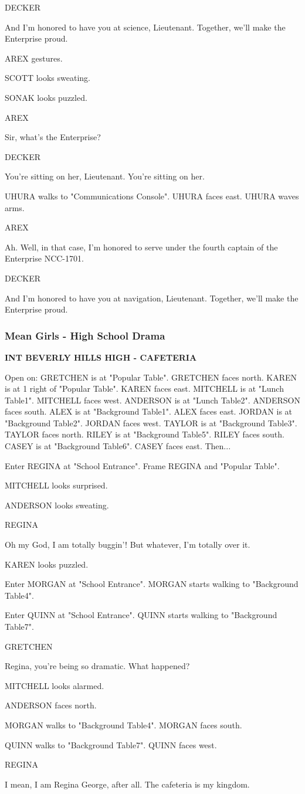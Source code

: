 \documentclass[11pt,letterpaper,oldstylefigures]{memoir}
\newcommand{\slugline}[1]{\nobreak\textbf{\MakeUppercase{#1}}\par\nobreak\vspace{1\baselineskip}}
\newcommand{\speaker}[1]{\nobreak\hspace*{0.333\textwidth}\MakeUppercase{#1}\par\nobreak\vspace{0.5\baselineskip}}
\newcommand{\dialogue}[1]{\nobreak\hspace*{0.25\textwidth}\begin{minipage}{0.5\textwidth}#1\end{minipage}\par\vspace{1\baselineskip}}
\newcommand{\stagedir}[1]{#1\par\vspace{1\baselineskip}}
\newenvironment{FountainExample}
  {\begingroup
  \ttfamily\small
   \setlength{\parindent}{0pt}
  \setlength{\parskip}{0.5em}
  \allowdisplaybreaks
  \setlength{\displaywidowpenalty}{0}
  \setlength{\widowpenalty}{0}
  \setlength{\clubpenalty}{0}
  \setlength{\interlinepenalty}{0}
}
  {\endgroup}
\newcommand{\paragraphbreak}{\vspace{0.5em}}
\begin{document}
\begin{FountainExample}
\speaker{DECKER}
\dialogue{And I'm honored to have you at science, Lieutenant. Together, we'll make the Enterprise proud.}

\stagedir{AREX gestures.}
\stagedir{SCOTT looks sweating.}
\stagedir{SONAK looks puzzled.}

\speaker{AREX}
\dialogue{Sir, what's the Enterprise?}

\speaker{DECKER}
\dialogue{You're sitting on her, Lieutenant. You're sitting on her.}

\stagedir{UHURA walks to "Communications Console". UHURA faces east. UHURA waves arms.}

\speaker{AREX}
\dialogue{Ah. Well, in that case, I'm honored to serve under the fourth captain of the Enterprise NCC-1701.}

\speaker{DECKER}
\dialogue{And I'm honored to have you at navigation, Lieutenant. Together, we'll make the Enterprise proud.}
\end{FountainExample}

\paragraphbreak

\subsubsection*{Mean Girls - High School Drama}
\label{ex:mean-girls-high-school-drama-1}

\begin{FountainExample}
\slugline{INT BEVERLY HILLS HIGH - CAFETERIA}

\stagedir{Open on: GRETCHEN is at "Popular Table". GRETCHEN faces north. KAREN is at 1 right of "Popular Table". KAREN faces east. MITCHELL is at "Lunch Table1". MITCHELL faces west. ANDERSON is at "Lunch Table2". ANDERSON faces south. ALEX is at "Background Table1". ALEX faces east. JORDAN is at "Background Table2". JORDAN faces west. TAYLOR is at "Background Table3". TAYLOR faces north. RILEY is at "Background Table5". RILEY faces south. CASEY is at "Background Table6". CASEY faces east. Then...}
\stagedir{Enter REGINA at "School Entrance". Frame REGINA and "Popular Table".}
\stagedir{MITCHELL looks surprised.}
\stagedir{ANDERSON looks sweating.}

\speaker{REGINA}
\dialogue{Oh my God, I am totally buggin'! But whatever, I'm totally over it.}

\stagedir{KAREN looks puzzled.}
\stagedir{Enter MORGAN at "School Entrance". MORGAN starts walking to "Background Table4".}
\stagedir{Enter QUINN at "School Entrance". QUINN starts walking to "Background Table7".}

\speaker{GRETCHEN}
\dialogue{Regina, you're being so dramatic. What happened?}

\stagedir{MITCHELL looks alarmed.}
\stagedir{ANDERSON faces north.}
\stagedir{MORGAN walks to "Background Table4". MORGAN faces south.}
\stagedir{QUINN walks to "Background Table7". QUINN faces west.}

\speaker{REGINA}
\dialogue{I mean, I am Regina George, after all. The cafeteria is my kingdom.}
\end{FountainExample}
\end{document}
